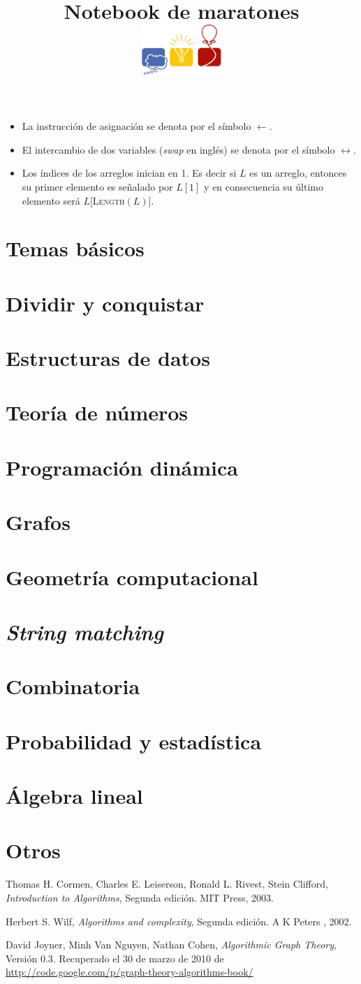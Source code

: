\documentclass{article}
\author{}
\title{Notebook de maratones \\
\includegraphics[width=30mm]{logo.png} }
\newcommand{\seccion}[2]{
\section{#1}					%
}
\begin{document}
\maketitle

\tableofcontents
\begin{itemize}
	\item La instrucci\'on de asignaci\'on se denota por el s\'imbolo $\leftarrow$.
	\item El intercambio de dos variables (\textsl{swap} en ingl\'es) se denota por el s\'imbolo $\leftrightarrow$.
	\item Los \'indices de los arreglos inician en 1. Es decir si $L$ es un arreglo, entonces su primer elemento es se\~nalado por $L[1]$ y en consecuencia su \'ultimo elemento ser\'a $L[$\textsc{Length}$(L)]$.
\end{itemize}

\pagebreak

\seccion{Temas b\'asicos}{./basics_and_format/basics_and_format}
\seccion{Dividir y conquistar}{./divide&conquer/divide&conquer}
\seccion{Estructuras de datos}{./ds/ds}
\seccion{Teor\'ia de n\'umeros}{./number_theory/number_theory}
\seccion{Programaci\'on din\'amica}{./dp/dp}          
\seccion{Grafos}{./graph_theory/graph_theory}
\seccion{Geometr\'ia computacional}{./geometry/geometry}
\seccion{\textit{String matching}}{./stringology/stringology}
\seccion{Combinatoria}{./combinatory/combinatory}
\seccion{Probabilidad y estad\'istica}{./probability/probability}
\seccion{\'Algebra lineal}{./linear_algebra/linear_algebra}
\seccion{Otros}{./others/others}

\pagebreak

\begin{thebibliography}{9}

  Thomas H. Cormen, Charles E. Leiserson, Ronald L. Rivest, Stein Clifford,
  \textit{Introduction to Algorithms},
  Segunda edici\'on. MIT Press, 2003.

  Herbert S. Wilf,
  \textit{Algorithms and complexity},
  Segunda edici\'on. A K Peters , 2002.

  David Joyner, Minh Van Nguyen, Nathan Cohen,
  \textit{Algorithmic Graph Theory},
  Versi\'on 0.3. Recuperado el 30 de marzo de 2010 de \url{http://code.google.com/p/graph-theory-algorithms-book/}

\end{thebibliography}
\end{document}
